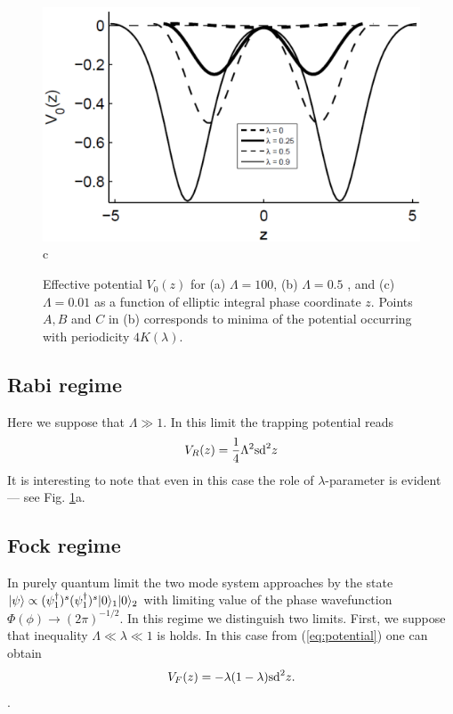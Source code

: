 \documentclass[aps, pre, preprint, groupedaddress, superscriptaddress, showkeys, showpacs] {revtex4-1}
\DeclarePairedDelimiter\ket{\lvert}{\rangle}
\begin{document}
\begin{figure}[ht]
\begin{minipage}[htbp]{0.32\linewidth}	{\includegraphics[width=1\linewidth]{pic/potential_L=001.png} \\ c}
\end{minipage}
\caption{
Effective potential $V_0(z)$ for (a) $\Lambda = 100$, (b) $\Lambda = 0.5$ , and (c) $\Lambda = 0.01$ as a function of  elliptic integral phase coordinate $z$.
Points $A, B$ and $C$ in (b) corresponds to minima of the potential occurring with periodicity $4K(\lambda)$. \label{phase_potential}}
\end{figure}
%

\subsection{Rabi regime}

Here we suppose that $\Lambda \gg 1$.
In this limit the trapping potential reads
%
\begin{equation}
V_R(z) = \dfrac{1}{4} \Lambda^2 \textrm{sd}^2{z}
\label{eq:rabi_potential}
\end{equation}
%
It is interesting to note that even in this case the role of $\lambda$-parameter is evident --- see Fig. \ref{phase_potential}a.

\subsection{Fock regime}

In purely quantum limit the two mode system approaches by the state $\ket{\psi} \propto (\psi_1^\dag)^s (\psi_1^\dag)^s \ket{0}_1 \ket{0}_2$ with limiting value of the phase wavefunction $\Phi(\phi) \to (2\pi)^{-1/2}$.
In this regime we distinguish two limits.
First, we suppose that inequality $\Lambda \ll \lambda \ll 1$ is holds.
In this case from (\ref{eq:potential}) one can obtain
%
\begin{equation}
V_F(z) = -\lambda(1 - \lambda) \textrm{sd}^2{z}.
\label{eq:fock1_potential}
\end{equation}.
%
\end{document}
